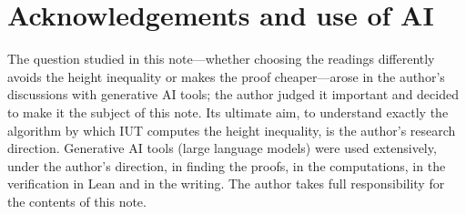 \documentclass[11pt,a4paper]{article}
\theoremstyle{plain}
\theoremstyle{definition}
\theoremstyle{remark}
\begin{document}
\section*{Acknowledgements and use of AI}
The question studied in this note---whether choosing the readings differently avoids the height inequality or makes the
proof cheaper---arose in the author's discussions with generative AI tools; the author judged it important and decided
to make it the subject of this note. Its ultimate aim, to understand exactly the algorithm by which IUT computes the
height inequality, is the author's research direction. Generative AI tools (large language models) were used
extensively, under the author's direction, in finding the proofs, in the computations, in the verification in Lean and
in the writing. The author takes full responsibility for the contents of this note.
\end{document}
